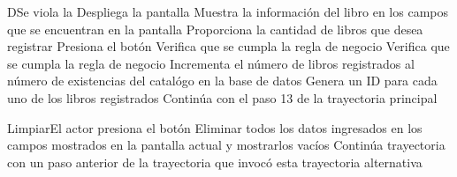 \begin{UCtrayectoriaA}{D}{Se viola la }
			\UCpaso[\UCsist] Despliega la pantalla 
			\UCpaso[\UCsist] Muestra la información del libro en los campos que se encuentran en la pantalla 
			\UCpaso[\UCactor] Proporciona la cantidad de libros que desea registrar
			\UCpaso[\UCactor] Presiona el botón  
			\UCpaso[\UCsist] Verifica que se cumpla la regla de negocio  
			\UCpaso[\UCsist] Verifica que se cumpla la regla de negocio  
			\UCpaso[\UCsist] Incrementa el número de libros registrados al número de existencias del catalógo en la base de datos
			\UCpaso[\UCsist] Genera un ID para cada uno de los libros registrados 
			\UCpaso[\UCsist] Continúa con el paso 13 de la trayectoria principal  
\end{UCtrayectoriaA}


\begin{UCtrayectoriaA}{Limpiar}{El actor presiona el botón }
			\UCpaso[\UCsist] Eliminar todos los datos ingresados en los campos mostrados en la pantalla actual y mostrarlos vacíos
			\UCpaso[\UCsist] Continúa trayectoria con un paso anterior de la trayectoria que invocó esta trayectoria alternativa
\end{UCtrayectoriaA}